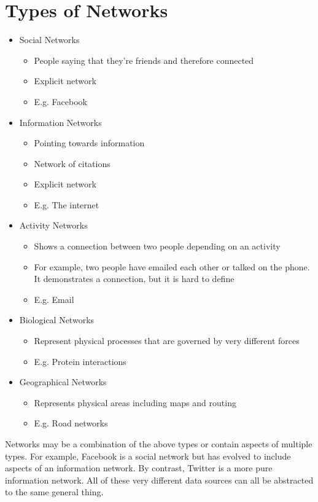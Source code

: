 \section{Types of Networks}
\begin{itemize}
	\item Social Networks
	\begin{itemize}
		\item People saying that they're friends and therefore connected
		\item Explicit network
		\item E.g. Facebook
	\end{itemize}
	\item Information Networks
	\begin{itemize}
		\item Pointing towards information
		\item Network of citations
		\item Explicit network
		\item E.g. The internet
	\end{itemize}
	\item Activity Networks
	\begin{itemize}
		\item Shows a connection between two people depending on an activity
		\item For example, two people have emailed each other or talked on the phone. It demonstrates a connection, but it is hard to define
		\item E.g. Email
	\end{itemize}
	\item Biological Networks
	\begin{itemize}
		\item Represent physical processes that are governed by very different forces
		\item E.g. Protein interactions
	\end{itemize}
	\item Geographical Networks
	\begin{itemize}
		\item Represents physical areas including maps and routing
		\item E.g. Road networks
	\end{itemize}
\end{itemize}
\noindent
Networks may be a combination of the above types or contain aspects of multiple types. For example, Facebook is a social network but has evolved to include aspects of an information network. By contrast, Twitter is a more pure information network. All of these very different data sources can all be abstracted to the same general thing.

